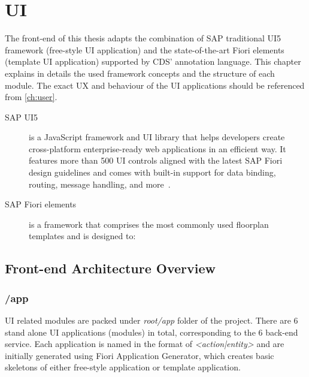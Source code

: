 \section{UI}
\label{sec:D-UI}

The front-end of this thesis adapts the combination of SAP traditional UI5 framework (free-style UI application) and the state-of-the-art Fiori elements (template UI application) supported by CDS' annotation language. \cite{fiori-design} This chapter explains in details the used framework concepts and the structure of each module. The exact UX and behaviour of the UI applications should be referenced from \autoref{ch:user}.

\begin{description}
	\item[SAP UI5] is a JavaScript framework and UI library that helps developers create cross-platform enterprise-ready web applications in an efficient way. It features more than 500 UI controls aligned with the latest SAP Fiori design guidelines and comes with built-in support for data binding, routing, message handling, and more~\cite{ui5}.
 
	\item[SAP Fiori elements] is a framework that comprises the most commonly used floorplan templates and is designed to:
      
\end{description}

\subsection{Front-end Architecture Overview}

\subsubsection{/app}

UI related modules are packed under \textit{root/app} folder of the project. There are 6 stand alone UI applications (modules) in total, corresponding to the 6 back-end service. Each application is named in the format of \textit{<action|entity>} and are initially generated using Fiori Application Generator, which creates basic skeletons of either free-style application or template application. 

